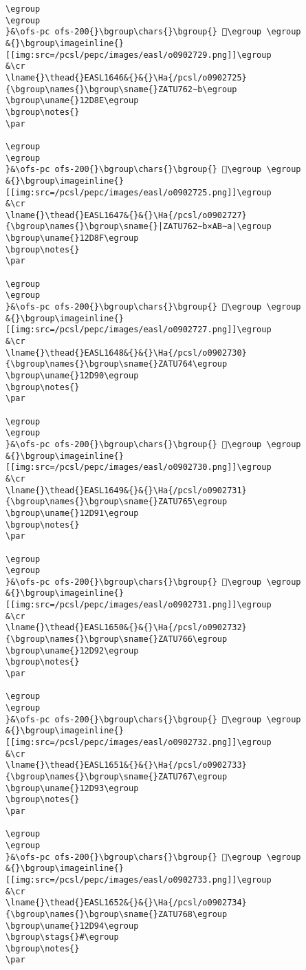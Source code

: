 \begin{verbatim}
\egroup
\egroup
}&\ofs-pc ofs-200{}\bgroup\chars{}\bgroup{} 𒶋\egroup \egroup
&{}\bgroup\imageinline{}[[img:src=/pcsl/pepc/images/easl/o0902729.png]]\egroup
&\cr
\lname{}\thead{}EASL1646&{}&{}\Ha{/pcsl/o0902725}{\bgroup\names{}\bgroup\sname{}ZATU762∼b\egroup
\bgroup\uname{}12D8E\egroup
\bgroup\notes{}
\par 

\egroup
\egroup
}&\ofs-pc ofs-200{}\bgroup\chars{}\bgroup{} 𒶎\egroup \egroup
&{}\bgroup\imageinline{}[[img:src=/pcsl/pepc/images/easl/o0902725.png]]\egroup
&\cr
\lname{}\thead{}EASL1647&{}&{}\Ha{/pcsl/o0902727}{\bgroup\names{}\bgroup\sname{}|ZATU762∼b×AB∼a|\egroup
\bgroup\uname{}12D8F\egroup
\bgroup\notes{}
\par 

\egroup
\egroup
}&\ofs-pc ofs-200{}\bgroup\chars{}\bgroup{} 𒶏\egroup \egroup
&{}\bgroup\imageinline{}[[img:src=/pcsl/pepc/images/easl/o0902727.png]]\egroup
&\cr
\lname{}\thead{}EASL1648&{}&{}\Ha{/pcsl/o0902730}{\bgroup\names{}\bgroup\sname{}ZATU764\egroup
\bgroup\uname{}12D90\egroup
\bgroup\notes{}
\par 

\egroup
\egroup
}&\ofs-pc ofs-200{}\bgroup\chars{}\bgroup{} 𒶐\egroup \egroup
&{}\bgroup\imageinline{}[[img:src=/pcsl/pepc/images/easl/o0902730.png]]\egroup
&\cr
\lname{}\thead{}EASL1649&{}&{}\Ha{/pcsl/o0902731}{\bgroup\names{}\bgroup\sname{}ZATU765\egroup
\bgroup\uname{}12D91\egroup
\bgroup\notes{}
\par 

\egroup
\egroup
}&\ofs-pc ofs-200{}\bgroup\chars{}\bgroup{} 𒶑\egroup \egroup
&{}\bgroup\imageinline{}[[img:src=/pcsl/pepc/images/easl/o0902731.png]]\egroup
&\cr
\lname{}\thead{}EASL1650&{}&{}\Ha{/pcsl/o0902732}{\bgroup\names{}\bgroup\sname{}ZATU766\egroup
\bgroup\uname{}12D92\egroup
\bgroup\notes{}
\par 

\egroup
\egroup
}&\ofs-pc ofs-200{}\bgroup\chars{}\bgroup{} 𒶒\egroup \egroup
&{}\bgroup\imageinline{}[[img:src=/pcsl/pepc/images/easl/o0902732.png]]\egroup
&\cr
\lname{}\thead{}EASL1651&{}&{}\Ha{/pcsl/o0902733}{\bgroup\names{}\bgroup\sname{}ZATU767\egroup
\bgroup\uname{}12D93\egroup
\bgroup\notes{}
\par 

\egroup
\egroup
}&\ofs-pc ofs-200{}\bgroup\chars{}\bgroup{} 𒶓\egroup \egroup
&{}\bgroup\imageinline{}[[img:src=/pcsl/pepc/images/easl/o0902733.png]]\egroup
&\cr
\lname{}\thead{}EASL1652&{}&{}\Ha{/pcsl/o0902734}{\bgroup\names{}\bgroup\sname{}ZATU768\egroup
\bgroup\uname{}12D94\egroup
\bgroup\stags{}#\egroup
\bgroup\notes{}
\par 


\end{verbatim}
